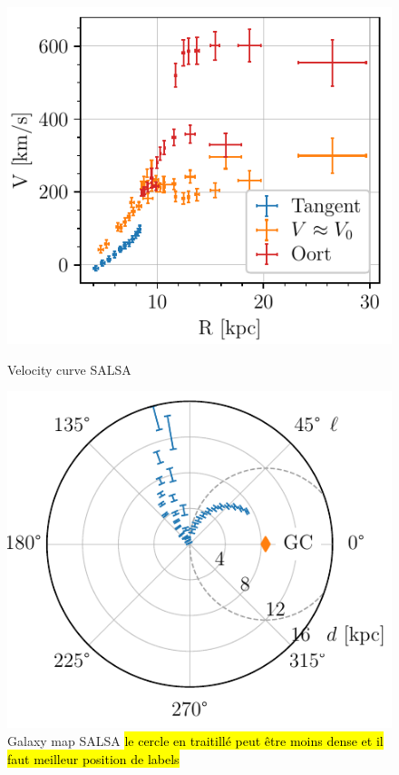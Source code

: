 \begin{figure}[htbp]
    \begin{minipage}[t]{0.5\textwidth}
        \centering
        \captionsetup{width=.95\textwidth}
        \includegraphics[scale=1]{figures/SALSA_velocity_curve.pdf}
        \caption{Velocity curve SALSA}
        \label{fig:SALSA_velocity_curve}
    \end{minipage}
    \begin{minipage}[t]{0.5\textwidth}
        \centering
        \captionsetup{width=.95\textwidth}
        \includegraphics[scale=1]{figures/SALSA_galaxy_map.pdf}
        \caption{Galaxy map SALSA \hl{le cercle en traitillé peut être moins dense et il faut meilleur position de labels}}
        \label{fig:SALSA_galaxy_map}
    \end{minipage}
\end{figure}